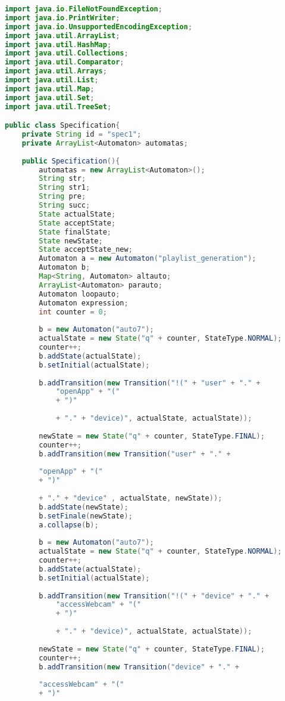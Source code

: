 \begin{lstlisting}[language=java, caption={Specification osztály.},captionpos=b]
import java.io.FileNotFoundException;
import java.io.PrintWriter;
import java.io.UnsupportedEncodingException;
import java.util.ArrayList;
import java.util.HashMap;
import java.util.Collections;
import java.util.Comparator;
import java.util.Arrays;
import java.util.List;
import java.util.Map;
import java.util.Set;
import java.util.TreeSet;

public class Specification{
	private String id = "spec1";
	private ArrayList<Automaton> automatas;
	
	public Specification(){
		automatas = new ArrayList<Automaton>();
		String str;
		String str1;
		String pre;
		String succ;
		State actualState;
		State acceptState;
		State finalState;
		State newState;
		State acceptState_new;
		Automaton a = new Automaton("playlist_generation");
		Automaton b;
		Map<String, Automaton> altauto;
		ArrayList<Automaton> parauto;
		Automaton loopauto;
		Automaton expression;
		int counter = 0;
		
		b = new Automaton("auto7");
		actualState = new State("q" + counter, StateType.NORMAL);
		counter++;
		b.addState(actualState);
		b.setInitial(actualState);
											
		b.addTransition(new Transition("!(" + "user" + "." +	
			"openApp" + "("
			+ ")"
			
			+ "." + "device)", actualState, actualState));
		
		newState = new State("q" + counter, StateType.FINAL);
		counter++;
		b.addTransition(new Transition("user" + "." +
		
		"openApp" + "("
		+ ")"
		
		+ "." + "device" , actualState, newState));
		b.addState(newState);
		b.setFinale(newState);
		a.collapse(b);
		
		b = new Automaton("auto7");
		actualState = new State("q" + counter, StateType.NORMAL);
		counter++;
		b.addState(actualState);
		b.setInitial(actualState);
											
		b.addTransition(new Transition("!(" + "device" + "." +	
			"accessWebcam" + "("
			+ ")"
			
			+ "." + "device)", actualState, actualState));
		
		newState = new State("q" + counter, StateType.FINAL);
		counter++;
		b.addTransition(new Transition("device" + "." +
		
		"accessWebcam" + "("
		+ ")"
		

\end{lstlisting}
